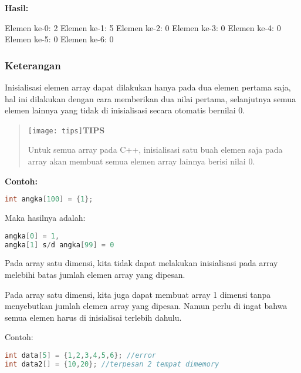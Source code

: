 

\textbf{Hasil:}

\begin{lcverbatim}
Elemen ke-0: 2
Elemen ke-1: 5
Elemen ke-2: 0
Elemen ke-3: 0
Elemen ke-4: 0
Elemen ke-5: 0
Elemen ke-6: 0
\end{lcverbatim}

\subsubsection*{Keterangan}

Inisialisasi elemen array dapat dilakukan hanya pada dua elemen pertama
saja, hal ini dilakukan dengan cara memberikan dua nilai pertama,
selanjutnya semua elemen lainnya yang tidak di inisialisasi secara
otomatis bernilai 0.

\begin{quotation}
\texttt{[image: tips]}\textbf{TIPS}

Untuk
semua array pada C++, inisialisasi satu buah elemen saja pada array akan
membuat semua elemen array lainnya berisi nilai 0.
\end{quotation}
 

\textbf{Contoh:}

\begin{lstlisting}[language=c++, numbers=none]
int angka[100] = {1};
\end{lstlisting}

Maka hasilnya adalah:

\begin{lstlisting}[language=c++, numbers=none]
angka[0] = 1,
angka[1] s/d angka[99] = 0
\end{lstlisting}

Pada array satu dimensi, kita tidak dapat melakukan inisialisasi pada
array melebihi batas jumlah elemen array yang dipesan.

Pada array satu dimensi, kita juga dapat membuat array 1 dimensi tanpa
menyebutkan jumlah elemen array yang dipesan. Namun perlu di ingat bahwa
semua elemen harus di inisialisai terlebih dahulu.

Contoh:

\begin{lstlisting}[language=c++, numbers=none]
int data[5] = {1,2,3,4,5,6}; //error
int data2[] = {10,20}; //terpesan 2 tempat dimemory
\end{lstlisting}

